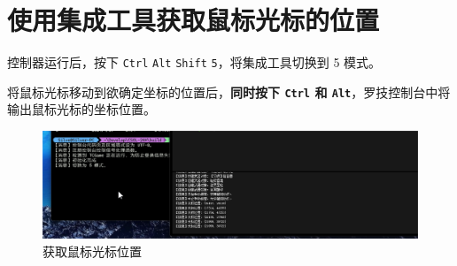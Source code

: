 \section{使用集成工具获取鼠标光标的位置}

控制器运行后，按下 \lstinline{Ctrl} \lstinline{Alt} \lstinline{Shift} \lstinline{5}，将集成工具切换到 5 模式。

将鼠标光标移动到欲确定坐标的位置后，\textbf{\color{red}同时按下 \lstinline{Ctrl} 和 \lstinline{Alt}}，罗技控制台中将输出鼠标光标的坐标位置。

\begin{figure}[H]
    \Centering
    \includegraphics[width=\textwidth]{documents/assets/position.png}
    \caption{获取鼠标光标位置}
\end{figure}